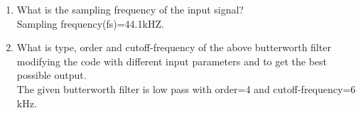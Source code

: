 \documentclass[journal, 12pt, twocolumn]{IEEEtran}
\renewcommand\thesection{\arabic{section}}
\begin{document}
\begin{enumerate}[label=\thesection.\arabic*]
	\item What is the sampling frequency of the input signal?
	      \\
	      \solution
	      Sampling frequency(fs)=44.1kHZ.
	\item
	      What is type, order and  cutoff-frequency of the above butterworth filter modifying the code with different input parameters and to get the best possible output.
	      \\
	      \solution
	      The given butterworth filter is low pass with order=4 and cutoff-frequency=6 kHz.
\end{enumerate}
\end{document}
